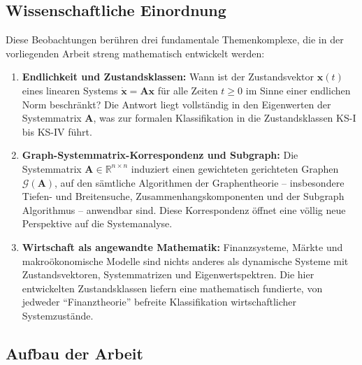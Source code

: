 \documentclass[a4paper, 12pt, twoside, openright]{report}
\theoremstyle{definition}
\theoremstyle{definition}
\newcommand{\R}{\mathbb{R}}
\newcommand{\vx}{\bm{x}}
\newcommand{\vA}{\bm{A}}
\begin{document}
\subsection{Wissenschaftliche Einordnung}

Diese Beobachtungen berühren drei fundamentale Themenkomplexe, die in der vorliegenden
Arbeit streng mathematisch entwickelt werden:

\begin{enumerate}[label=(\roman*)]
  \item \textbf{Endlichkeit und Zustandsklassen:} Wann ist der Zustandsvektor
    $\vx(t)$ eines linearen Systems $\dot{\vx} = \vA\vx$ für alle Zeiten $t \geq 0$
    im Sinne einer endlichen Norm beschränkt? Die Antwort liegt vollständig in den
    Eigenwerten der Systemmatrix $\vA$, was zur formalen Klassifikation in die
    Zustandsklassen KS-I bis KS-IV führt.

  \item \textbf{Graph-Systemmatrix-Korrespondenz und Subgraph:} Die Systemmatrix
    $\vA \in \R^{n \times n}$ induziert einen gewichteten gerichteten Graphen
    $\mathcal{G}(\vA)$, auf den sämtliche Algorithmen der Graphentheorie -- insbesondere
    Tiefen- und Breitensuche, Zusammenhangskomponenten und der Subgraph Algorithmus --
    anwendbar sind. Diese Korrespondenz öffnet eine völlig neue Perspektive auf die
    Systemanalyse.

  \item \textbf{Wirtschaft als angewandte Mathematik:} Finanzsysteme, Märkte und
    makroökonomische Modelle sind nichts anderes als dynamische Systeme mit
    Zustandsvektoren, Systemmatrizen und Eigenwertspektren. Die hier entwickelten
    Zustandsklassen liefern eine mathematisch fundierte, von jedweder
    ``Finanztheorie'' befreite Klassifikation wirtschaftlicher Systemzustände.
\end{enumerate}

\subsection{Aufbau der Arbeit}
\end{document}

